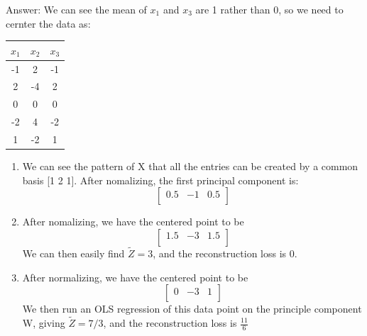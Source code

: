 \documentclass{article}
\newenvironment{answer}{\par\begingroup\color{gre}Answer: }{\endgroup}
\begin{document}
\begin{answer}
	We can see the mean of $x_1$ and $x_3$ are 1 rather than 0, so we need to cernter the data as:
	\begin{center}
		\begin{tabular}{ccc}
		  $x_1$ & $x_2$ & $x_3$ \\
		  \hline
		   -1 &  2 &  -1 \\
		   2 & -4 &  2 \\
		   0 &  0 &  0 \\
		  -2 &  4 & -2 \\
		   1 & -2 &  1 \\
		\end{tabular}
	\end{center}

	\begin{enumerate}
		\item We can see the pattern of X that all the entries can be created by a common basis [1 2 1]. After nomalizing, the first principal component is:
		\begin{equation*}
			\begin{bmatrix}
				0.5 & -1 & 0.5 \\
			\end{bmatrix}
		\end{equation*}

		\item After nomalizing, we have the centered point to be 
		\begin{equation*}
			\begin{bmatrix}
				1.5 & -3 & 1.5 \\
			\end{bmatrix}
		\end{equation*}
		We can then easily find $\tilde{Z} = 3$, and the reconstruction loss is 0.

		\item After normalizing, we have the centered point to be
		\begin{equation*}
			\begin{bmatrix}
				0 & -3 & 1 \\
			\end{bmatrix}
		\end{equation*}
		We then run an OLS regression of this data point on the principle component W, giving $\tilde{Z} = 7/3$, and the reconstruction loss is $\frac{11}{6}$


	\end{enumerate}

\end{answer}
\end{document}
